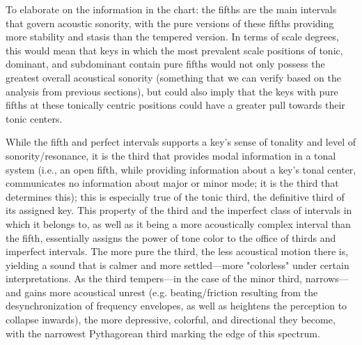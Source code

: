     To elaborate on the information in the chart: the fifths are the main
intervals that govern acoustic sonority, with the pure versions of these
fifths providing more stability and stasis than the tempered version. In
terms of scale degrees, this would mean that keys in which the most
prevalent scale positions of tonic, dominant, and subdominant contain
pure fifths would not only possess the greatest overall acoustical
sonority (something that we can verify based on the analysis from
previous sections), but could also imply that the keys with pure fifths
at these tonically centric positions could have a greater pull towards
their tonic centers.

While the fifth and perfect intervals supports a key's sense of tonality
and level of sonority/resonance, it is the third that provides modal
information in a tonal system (i.e., an open fifth, while providing
information about a key's tonal center, communicates no information
about major or minor mode; it is the third that determines this); this
is especially true of the tonic third, the definitive third of its
assigned key. This property of the third and the imperfect class of
intervals in which it belongs to, as well as it being a more
acoustically complex interval than the fifth, essentially assigns the
power of tone color to the office of thirds and imperfect intervals. The
more pure the third, the less acoustical motion there is, yielding a
sound that is calmer and more settled---more "colorless" under
certain interpretations. As the third tempers---in the case of the
minor third, narrows---and gains more acoustical unrest (e.g.
beating/friction resulting from the desynchronization of frequency
envelopes, as well as heightens the perception to collapse inwards), the
more depressive, colorful, and directional they become, with the
narrowest Pythagorean third marking the edge of this spectrum.

